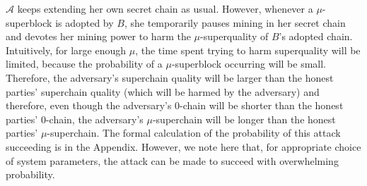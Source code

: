 $\mathcal{A}$ keeps extending her own secret chain as usual. However, whenever a
$\mu$-superblock is adopted by $B$, she temporarily pauses mining in her secret
chain and devotes her mining power to harm the $\mu$-superquality of $B$'s
adopted chain. Intuitively, for large enough $\mu$, the time spent trying to
harm superquality will be limited, because the probability of a $\mu$-superblock
occurring will be small. Therefore, the adversary's superchain quality will be
larger than the honest parties' superchain quality (which will be harmed by the
adversary) and therefore, even though the adversary's $0$-chain will be shorter
than the honest parties' $0$-chain, the adversary's $\mu$-superchain will be
longer than the honest parties' $\mu$-superchain. The formal calculation of the
probability of this attack succeeding is in the Appendix. However, we note here
that, for appropriate choice of system parameters, the attack can be made to
succeed with overwhelming probability.
